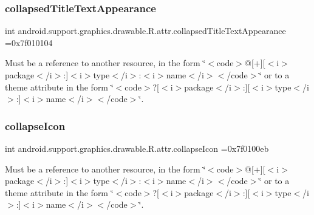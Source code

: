 \subsubsection{\texorpdfstring{collapsed\+Title\+Text\+Appearance}{collapsedTitleTextAppearance}}
{\footnotesize\ttfamily int android.\+support.\+graphics.\+drawable.\+R.\+attr.\+collapsed\+Title\+Text\+Appearance =0x7f010104\hspace{0.3cm}{\ttfamily [static]}}

Must be a reference to another resource, in the form \char`\"{}$<$code$>$@\mbox{[}+\mbox{]}\mbox{[}$<$i$>$package$<$/i$>$\+:\mbox{]}$<$i$>$type$<$/i$>$\+:$<$i$>$name$<$/i$>$$<$/code$>$\char`\"{} or to a theme attribute in the form \char`\"{}$<$code$>$?\mbox{[}$<$i$>$package$<$/i$>$\+:\mbox{]}\mbox{[}$<$i$>$type$<$/i$>$\+:\mbox{]}$<$i$>$name$<$/i$>$$<$/code$>$\char`\"{}. \mbox{\label{classandroid_1_1support_1_1graphics_1_1drawable_1_1R_1_1attr_ac0d50047088c492d589b96315f628498}} 
\subsubsection{\texorpdfstring{collapse\+Icon}{collapseIcon}}
{\footnotesize\ttfamily int android.\+support.\+graphics.\+drawable.\+R.\+attr.\+collapse\+Icon =0x7f0100eb\hspace{0.3cm}{\ttfamily [static]}}

Must be a reference to another resource, in the form \char`\"{}$<$code$>$@\mbox{[}+\mbox{]}\mbox{[}$<$i$>$package$<$/i$>$\+:\mbox{]}$<$i$>$type$<$/i$>$\+:$<$i$>$name$<$/i$>$$<$/code$>$\char`\"{} or to a theme attribute in the form \char`\"{}$<$code$>$?\mbox{[}$<$i$>$package$<$/i$>$\+:\mbox{]}\mbox{[}$<$i$>$type$<$/i$>$\+:\mbox{]}$<$i$>$name$<$/i$>$$<$/code$>$\char`\"{}. \mbox{\label{classandroid_1_1support_1_1graphics_1_1drawable_1_1R_1_1attr_a1791c732d6a64cc87de054a953136a6d}} 
